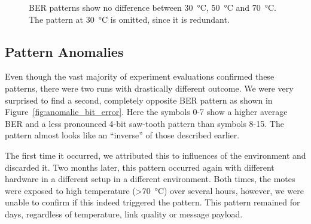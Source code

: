 \begin{figure}[t]
	\caption{\acl{BER} patterns show no difference between \SI{30}{\celsius}, \SI{50}{\celsius} and \SI{70}{\celsius}. The pattern at \SI{30}{\celsius} is omitted, since it is redundant.}
	\label{fig:temperature_bit_errors}
\end{figure}


\subsection{Pattern Anomalies}
\label{subsec:pattern_anomalies}

Even though the vast majority of experiment evaluations confirmed these patterns, there were two runs with  drastically different outcome.
We were very surprised to find a second, completely opposite \ac{BER} pattern as shown in Figure~\ref{fig:anomalie_bit_error}.
Here the symbols 0-7 show a higher average \ac{BER} and a less pronounced 4-bit saw-tooth pattern than symbols 8-15.
The pattern almost looks like an ``inverse'' of those described earlier.

The first time it occurred, we attributed this to influences of the environment and discarded it.
Two months later, this pattern occurred again with different hardware in a different setup in a different environment.
Both times, the motes were exposed to high temperature (>\SI{70}{\celsius}) over several hours, however, we were unable to confirm if this indeed triggered the pattern.
This pattern remained for days, regardless of temperature, link quality or message payload.

